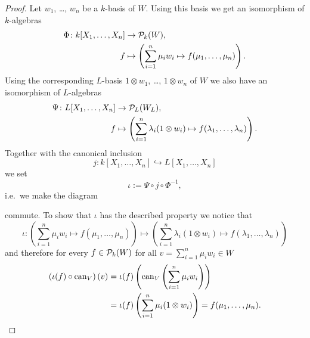\begin{proof}
 Let $w_1$, \dots, $w_n$ be a $k$-basis of $W$. Using this basis we get an isomorphism of $k$-algebras
 \begin{align*}
  \Phi \colon k[X_1, \dotsc, X_n] &\to \mathcal{P}_k(W), \\
  f &\mapsto \left( \sum_{i=1}^n \mu_i w_i \mapsto f(\mu_1, \dotsc, \mu_n) \right).
 \end{align*}
 Using the corresponding $L$-basis $1 \otimes w_1$, \dots, $1 \otimes w_n$ of $W$ we also have an isomorphism of $L$-algebras
 \begin{align*}
  \Psi \colon L[X_1, \dotsc, X_n] &\to \mathcal{P}_L(W_L), \\
  f &\mapsto \left( \sum_{i=1}^n \lambda_i (1 \otimes w_i) \mapsto f(\lambda_1, \dotsc, \lambda_n) \right).
 \end{align*}
 Together with the canonical inclusion
 \[
  j \colon k[X_1, \dotsc, X_n] \hookrightarrow L[X_1, \dotsc, X_n]
 \]
 we set
 \[
  \iota := \Psi \circ j \circ \Phi^{-1},
 \]
 i.e.\ we make the diagram
 \begin{center}
 \end{center}
 commute. To show that $\iota$ has the described property we notice that
 \[
  \iota \colon
  \left( \sum_{i=1}^n \mu_i w_i \mapsto f(\mu_1, \dotsc, \mu_n) \right)
  \mapsto
  \left( \sum_{i=1}^n \lambda_i (1 \otimes w_i) \mapsto f(\lambda_1, \dotsc, \lambda_n) \right)
 \]
 and therefore for every $f \in \mathcal{P}_k(W)$ for all $v = \sum_{i=1}^n \mu_i w_i \in W$
 \begin{align*}
  \left( \iota(f) \circ \operatorname{can}_V \right)(v)
  &= \iota(f)\left( \operatorname{can}_V\left( \sum_{i=1}^n \mu_i w_i \right) \right) \\
  &= \iota(f)\left( \sum_{i=1}^n \mu_i (1 \otimes w_i) \right)
  = f(\mu_1, \dotsc, \mu_n).
 \end{align*}
 

\end{proof}
